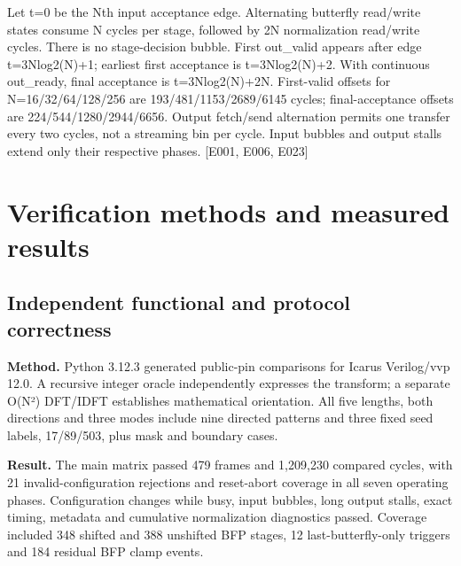 \documentclass[11pt,a4paper]{article}
\begin{document}
Let t=\allowbreak{}0 be the Nth input acceptance edge. Alternating butterfly read/\allowbreak{}write states consume N cycles per stage,\allowbreak{} followed by 2N normalization read/\allowbreak{}write cycles. There is no stage-decision bubble. First out\_\allowbreak{}valid appears after edge t=\allowbreak{}3Nlog2(\allowbreak{}N)\allowbreak{}+\allowbreak{}1; earliest first acceptance is t=\allowbreak{}3Nlog2(\allowbreak{}N)\allowbreak{}+\allowbreak{}2. With continuous out\_\allowbreak{}ready,\allowbreak{} final acceptance is t=\allowbreak{}3Nlog2(\allowbreak{}N)\allowbreak{}+\allowbreak{}2N. First-valid offsets for N=\allowbreak{}16/\allowbreak{}32/\allowbreak{}64/\allowbreak{}128/\allowbreak{}256 are 193/\allowbreak{}481/\allowbreak{}1153/\allowbreak{}2689/\allowbreak{}6145 cycles; final-acceptance offsets are 224/\allowbreak{}544/\allowbreak{}1280/\allowbreak{}2944/\allowbreak{}6656. Output fetch/\allowbreak{}send alternation permits one transfer every two cycles,\allowbreak{} not a streaming bin per cycle. Input bubbles and output stalls extend only their respective phases. [\allowbreak{}E001,\allowbreak{} E006,\allowbreak{} E023]\allowbreak{}

\section{Verification methods and measured results}

\subsection{Independent functional and protocol correctness}

\textbf{Method.} Python 3.12.3 generated public-pin comparisons for Icarus Verilog/\allowbreak{}vvp 12.0. A recursive integer oracle independently expresses the transform; a separate O(\allowbreak{}N²)\allowbreak{} DFT/\allowbreak{}IDFT establishes mathematical orientation. All five lengths,\allowbreak{} both directions and three modes include nine directed patterns and three fixed seed labels,\allowbreak{} 17/\allowbreak{}89/\allowbreak{}503,\allowbreak{} plus mask and boundary cases.

\textbf{Result.} The main matrix passed 479 frames and 1,\allowbreak{}209,\allowbreak{}230 compared cycles,\allowbreak{} with 21 invalid-configuration rejections and reset-abort coverage in all seven operating phases. Configuration changes while busy,\allowbreak{} input bubbles,\allowbreak{} long output stalls,\allowbreak{} exact timing,\allowbreak{} metadata and cumulative normalization diagnostics passed. Coverage included 348 shifted and 388 unshifted BFP stages,\allowbreak{} 12 last-butterfly-only triggers and 184 residual BFP clamp events.
\end{document}
